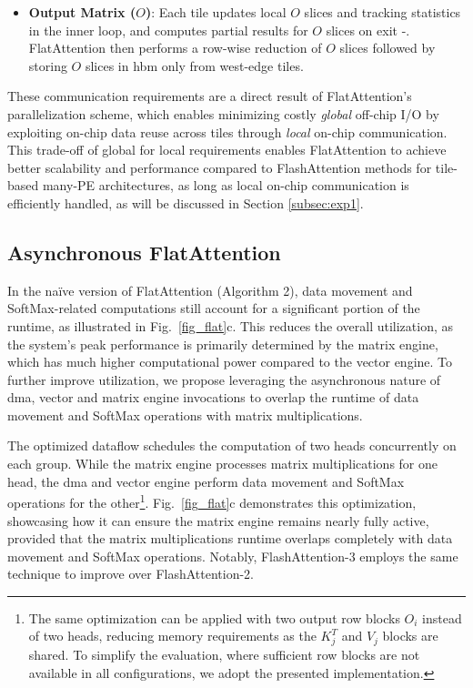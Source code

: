 \documentclass[conference]{IEEEtran}
\begin{document}
\begin{itemize}
    \item \textbf{Output Matrix ($O$)}:
    Each tile updates local $O$ slices and tracking statistics in the inner loop, and computes partial results for $O$ slices on exit -. FlatAttention then performs a row-wise reduction of $O$ slices  followed by storing $O$ slices in \gls{hbm}  only from west-edge tiles.
\end{itemize}

These communication requirements are a direct result of FlatAttention's parallelization scheme, which enables minimizing costly \textit{global} off-chip I/O by exploiting on-chip data reuse across tiles through \textit{local} on-chip communication. This trade-off of global for local requirements enables FlatAttention to achieve better scalability and performance compared to FlashAttention methods for tile-based many-PE architectures, as long as local on-chip communication is efficiently handled, as will be discussed in Section \ref{subsec:exp1}.

\subsection{Asynchronous FlatAttention}
\label{subsec:opti}

In the na\"ive version of FlatAttention (Algorithm 2), data movement and SoftMax-related computations still account for a significant portion of the runtime, as illustrated in Fig.~\ref{fig_flat}c. This reduces the overall utilization, as the system's peak performance is primarily determined by the matrix engine, which has much higher computational power compared to the vector engine. To further improve utilization, we propose leveraging the asynchronous nature of \gls{dma}, vector and matrix engine invocations to overlap the runtime of data movement and SoftMax operations with matrix multiplications.

The optimized dataflow schedules the computation of two heads concurrently on each group. While the matrix engine processes matrix multiplications for one head, the \gls{dma} and vector engine perform data movement and SoftMax operations for the other\footnote{The same optimization can be applied with two output row blocks $O_i$ instead of two heads, reducing memory requirements as the $K^T_j$ and $V_j$ blocks are shared. To simplify the evaluation, where sufficient row blocks are not available in all configurations, we adopt the presented implementation.}. Fig.~\ref{fig_flat}c demonstrates this optimization, showcasing how it can ensure the matrix engine remains nearly fully active, provided that the matrix multiplications runtime overlaps completely with data movement and SoftMax operations. Notably, FlashAttention-3 employs the same technique to improve over FlashAttention-2.
\end{document}
